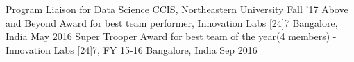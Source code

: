 \begin{cvhonors}
    \cvhonor
    {Program Liaison for Data Science}
    {CCIS, Northeastern University}
    {}
    {Fall '17}
  \cvhonor
    {Above and Beyond}
    {Award for best team performer, Innovation Labs [24]7}
    {Bangalore, India}
    {May 2016}
  \cvhonor
    {Super Trooper}
    {Award for best team of the year(4 members) - Innovation Labs [24]7, FY 15-16}
    {Bangalore, India}
    {Sep 2016}
\end{cvhonors}